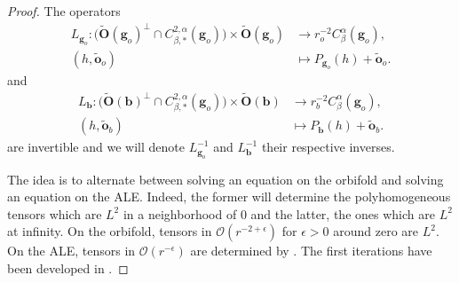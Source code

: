 \documentclass[12pt]{article}
\begin{document}
    \begin{proof}
    The operators
    $$
    \begin{aligned}
      L_{\mathbf{g}_o}: \big(\tilde{\mathbf{O}}(\mathbf{g}_o)^\perp\cap C^{2,\alpha}_{\beta,*}(\mathbf{g}_o) \big)\times \tilde{\mathbf{O}}(\mathbf{g}_o) &\to r^{-2}_oC^{\alpha}_\beta(\mathbf{g}_o),\\
      (h,\tilde{\mathbf{o}}_o)&\mapsto P_{\mathbf{g}_o}(h) + \tilde{\mathbf{o}}_o.
    \end{aligned}
    $$
    and
    $$
    \begin{aligned}
      L_{\mathbf{b}}: \big(\tilde{\mathbf{O}}(\mathbf{b})^\perp\cap C^{2,\alpha}_{\beta,*}(\mathbf{g}_o) \big)\times \tilde{\mathbf{O}}(\mathbf{b}) &\to r^{-2}_bC^{\alpha}_\beta(\mathbf{g}_o),\\
      (h,\tilde{\mathbf{o}}_b)&\mapsto P_{\mathbf{b}}(h) + \tilde{\mathbf{o}}_b.
    \end{aligned}
    $$
    are invertible and we will denote $L_{\mathbf{g}_o}^{-1}$ and $ L_{\mathbf{b}}^{-1}$ their respective inverses.
    
        The idea is to alternate between solving an equation on the orbifold and solving an equation on the ALE. Indeed, the former will determine the polyhomogeneous tensors which are $L^2$ in a neighborhood of $0$ and the latter, the ones which are $L^2$ at infinity. On the orbifold, tensors in $\mathcal{O}(r^{-2+\epsilon})$ for $\epsilon>0$ around zero are $L^2$. On the ALE, tensors in $\mathcal{O}(r^{-\epsilon})$ are determined by \cite{biq1,ozu2}. The first iterations have been developed in \cite{biq1,biq2,ozu2,ozu3}.
        

\end{proof}
\end{document}
